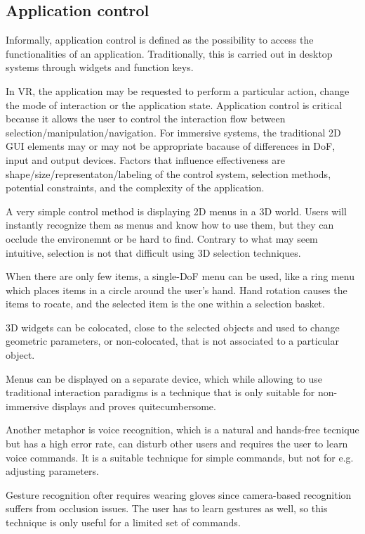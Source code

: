 \documentclass[a4paper]{article}
\begin{document}
\subsection{Application control}

Informally, application control is defined as the possibility to access the functionalities of an application.
Traditionally, this is carried out in desktop systems through widgets and function keys.

In VR, the application may be requested to perform a particular action, change the mode of interaction or the application state.
Application control is critical because it allows the user to control the interaction flow between selection/manipulation/navigation.
For immersive systems, the traditional 2D GUI elements may or may not be appropriate bacause of differences in DoF, input and output devices.
Factors that influence effectiveness are shape/size/representaton/labeling of the control system, selection methods, potential constraints, and the complexity of the application.

A very simple control method is displaying 2D menus in a 3D world.
Users will instantly recognize them as menus and know how to use them, but they can occlude the environemnt or be hard to find.
Contrary to what may seem intuitive, selection is not that difficult using 3D selection techniques.

When there are only few items, a single-DoF menu can be used, like a ring menu which places items in a circle around the user's hand.
Hand rotation causes the items to rocate, and the selected item is the one within a selection basket.

3D widgets can be colocated, close to the selected objects and used to change geometric parameters, or non-colocated, that is not associated to a particular object.

Menus can be displayed on a separate device, which while allowing to use traditional interaction paradigms is a technique that is only suitable for non-immersive displays and proves quitecumbersome.

Another metaphor is voice recognition, which is a natural and hands-free tecnique but has a high error rate, can disturb other users and requires the user to learn voice commands.
It is a suitable technique for simple commands, but not for e.g. adjusting parameters.

Gesture recognition ofter requires wearing gloves since camera-based recognition suffers from occlusion issues.
The user has to learn gestures as well, so this technique is only useful for a limited set of commands.
\end{document}
